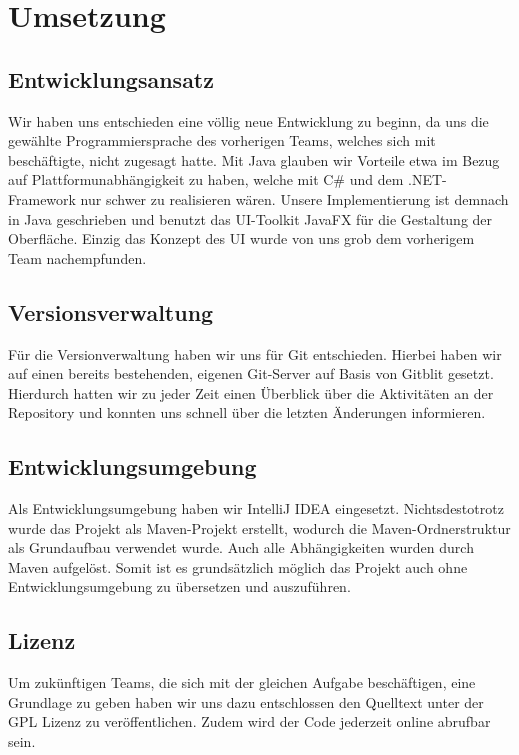 \pagebreak
\section{Umsetzung}

\subsection{Entwicklungsansatz}
Wir haben uns entschieden eine völlig neue Entwicklung zu beginn, da uns die gewählte
Programmiersprache des vorherigen Teams, welches sich mit \textFlowDesign{} beschäftigte,
nicht zugesagt hatte. Mit Java glauben wir Vorteile etwa im Bezug auf 
Plattformunabhängigkeit zu haben, welche mit C\# und dem .NET-Framework nur schwer zu
realisieren wären. \newline
Unsere Implementierung ist demnach in Java geschrieben und benutzt das UI-Toolkit JavaFX
für die Gestaltung der Oberfläche. \newline
Einzig das Konzept des UI wurde von uns grob dem vorherigem Team nachempfunden.

\subsection{Versionsverwaltung}
Für die Versionverwaltung haben wir uns für Git entschieden. Hierbei haben wir auf einen
bereits bestehenden, eigenen Git-Server auf Basis von Gitblit gesetzt. Hierdurch hatten
wir zu jeder Zeit einen Überblick über die Aktivitäten an der Repository und konnten
uns schnell über die letzten Änderungen informieren.

\subsection{Entwicklungsumgebung}
Als Entwicklungsumgebung haben wir IntelliJ IDEA eingesetzt. Nichtsdestotrotz wurde das Projekt
als Maven-Projekt erstellt, wodurch die Maven-Ordnerstruktur als Grundaufbau verwendet wurde.
Auch alle Abhängigkeiten wurden durch Maven aufgelöst. Somit ist es grundsätzlich möglich das
Projekt auch ohne Entwicklungsumgebung zu übersetzen und auszuführen.

\subsection{Lizenz}
Um zukünftigen Teams, die sich mit der gleichen Aufgabe beschäftigen, eine Grundlage zu geben
haben wir uns dazu entschlossen den Quelltext unter der GPL Lizenz zu veröffentlichen. Zudem
wird der Code jederzeit online abrufbar sein.